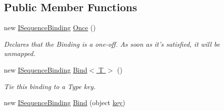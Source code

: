 \subsection*{Public Member Functions}
\begin{DoxyCompactItemize}
\item 
\hypertarget{interfacestrange_1_1extensions_1_1sequencer_1_1api_1_1_i_sequence_binding_a2ee9928660f3e2973c970aa8c802b648}{new \hyperlink{interfacestrange_1_1extensions_1_1sequencer_1_1api_1_1_i_sequence_binding}{I\-Sequence\-Binding} \hyperlink{interfacestrange_1_1extensions_1_1sequencer_1_1api_1_1_i_sequence_binding_a2ee9928660f3e2973c970aa8c802b648}{Once} ()}\label{interfacestrange_1_1extensions_1_1sequencer_1_1api_1_1_i_sequence_binding_a2ee9928660f3e2973c970aa8c802b648}

\begin{DoxyCompactList}\small\item\em Declares that the Binding is a one-\/off. As soon as it's satisfied, it will be unmapped. \end{DoxyCompactList}\item 
\hypertarget{interfacestrange_1_1extensions_1_1sequencer_1_1api_1_1_i_sequence_binding_af1811e711f28d4b809f4c5f6ecd1a7e0}{new \hyperlink{interfacestrange_1_1extensions_1_1sequencer_1_1api_1_1_i_sequence_binding}{I\-Sequence\-Binding} \hyperlink{interfacestrange_1_1extensions_1_1sequencer_1_1api_1_1_i_sequence_binding_af1811e711f28d4b809f4c5f6ecd1a7e0}{Bind$<$ T $>$} ()}\label{interfacestrange_1_1extensions_1_1sequencer_1_1api_1_1_i_sequence_binding_af1811e711f28d4b809f4c5f6ecd1a7e0}

\begin{DoxyCompactList}\small\item\em Tie this binding to a Type key. \end{DoxyCompactList}\item 
\hypertarget{interfacestrange_1_1extensions_1_1sequencer_1_1api_1_1_i_sequence_binding_a89c5884c1202f8eb7a05c2f56b51afe7}{new \hyperlink{interfacestrange_1_1extensions_1_1sequencer_1_1api_1_1_i_sequence_binding}{I\-Sequence\-Binding} \hyperlink{interfacestrange_1_1extensions_1_1sequencer_1_1api_1_1_i_sequence_binding_a89c5884c1202f8eb7a05c2f56b51afe7}{Bind} (object \hyperlink{interfacestrange_1_1framework_1_1api_1_1_i_binding_acec8686208598f9f4a952ffd05449c4d}{key})}\label{interfacestrange_1_1extensions_1_1sequencer_1_1api_1_1_i_sequence_binding_a89c5884c1202f8eb7a05c2f56b51afe7}


\end{DoxyCompactItemize}

